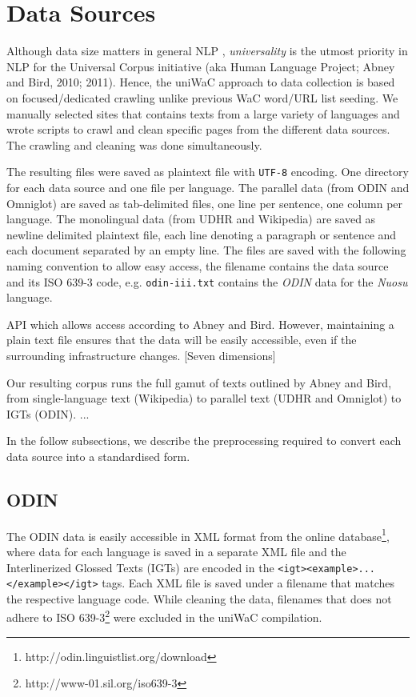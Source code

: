 \documentclass[11pt]{article}
\begin{document}
\section{Data Sources}

Although data size matters in general NLP \cite{banko2001scaling}, \emph{universality} is the utmost priority in NLP for the Universal Corpus initiative (aka Human Language Project; Abney and Bird, 2010; 2011). Hence, the uniWaC approach to data collection is based on focused/dedicated crawling unlike previous WaC word/URL list seeding. We manually selected sites that contains texts from a large variety of languages and wrote scripts to crawl and clean specific pages from the different data sources. The crawling and cleaning was done simultaneously. 

The resulting files were saved as plaintext file with \texttt{UTF-8} encoding. One directory for each data source and one file per language. The parallel data (from ODIN and Omniglot) are saved as tab-delimited files, one line per sentence, one column per language. The monolingual data (from UDHR and Wikipedia) are saved as newline delimited plaintext file, each line denoting a paragraph or sentence and each document separated by an empty line. The files are saved with the following naming convention to allow easy access, the filename contains the data source and its ISO 639-3 code, e.g. \texttt{odin-iii.txt} contains the \emph{ODIN} data for the \emph{Nuosu} language.

API which allows access according to Abney and Bird.  However, maintaining a plain text file ensures that the data will be easily accessible, even if the surrounding infrastructure changes. [Seven dimensions]

Our resulting corpus runs the full gamut of texts outlined by Abney and Bird, from single-language text (Wikipedia) to parallel text (UDHR and Omniglot) to IGTs (ODIN). ...

In the follow subsections, we describe the preprocessing required to convert each data source into a standardised form.

\subsection{ODIN}

The ODIN data is easily accessible in XML format from the online database\footnote{http://odin.linguistlist.org/download}, where data for each language is saved in a separate XML file and the Interlinerized Glossed Texts (IGTs) are encoded in the \texttt{<igt><example>...</example></igt>} tags. Each XML file is saved under a filename that matches the respective language code. While cleaning the data, filenames that does not adhere to ISO 639-3\footnote{http://www-01.sil.org/iso639-3} were excluded in the uniWaC compilation.
\end{document}
